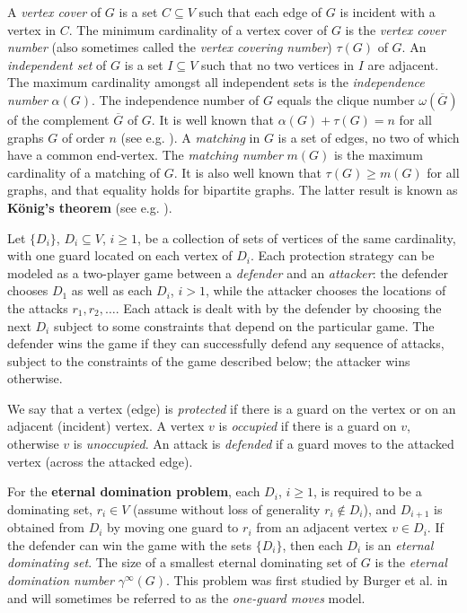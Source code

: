 \documentclass[12pt]{article}%
\begin{document}
A \emph{vertex cover} of $G$ is a set $C\subseteq V$ such that each edge of
$G$ is incident with a vertex in $C$. The minimum cardinality of a vertex
cover of $G$ is the \emph{vertex cover number} (also sometimes called the
\emph{vertex covering number})\emph{ }$\tau(G)$ of $G$. An \emph{independent
set} of $G$ is a set $I\subseteq V$ such that no two vertices in $I$ are
adjacent. The maximum cardinality amongst all independent sets is the
\emph{independence number} $\alpha(G)$. The independence number of $G$ equals
the clique number\emph{ }$\omega(\overline{G})$ of the complement
$\overline{G}$ of $G$. It is well known that $\alpha(G)+\tau(G)=n$ for all
graphs $G$ of order $n$ (see e.g. \cite[p. 241]{CL}). A \emph{matching }in $G$
is a set of edges, no two of which have a common end-vertex. The
\emph{matching number }$m(G)$ is the maximum cardinality of a matching of $G$.
It is also well known that $\tau(G)\geq m(G)$ for all graphs, and that
equality holds for bipartite graphs. The latter result is known as
\textbf{K\"{o}nig's theorem} (see e.g. \cite[Theorem 9.13]{CL}).



Let $\{D_{i}\}$, $D_{i}\subseteq V$, $i\geq1$, be a collection of sets of
vertices of the same cardinality, with one guard located on each vertex of
$D_{i}$. Each protection strategy can be modeled as a two-player game between
a \emph{defender} and an \emph{attacker}: the defender chooses $D_{1}$ as well
as each $D_{i}$, $i>1$, while the attacker chooses the locations of the
attacks $r_{1},r_{2},\ldots$. Each attack is dealt with by the defender by
choosing the next $D_{i}$ subject to some constraints that depend on the
particular game. The defender wins the game if they can successfully defend
any sequence of attacks, subject to the constraints of the game described
below; the attacker wins otherwise.

We say that a vertex (edge) is \emph{protected} if there is a guard on the
vertex or on an adjacent (incident) vertex. A vertex $v$ is \emph{occupied} if
there is a guard on $v$, otherwise $v$ is \emph{unoccupied}. An attack is
\emph{defended} if a guard moves to the attacked vertex (across the attacked edge).

For the \textbf{eternal domination problem}, each $D_{i}$, $i\geq1$, is
required to be a dominating set, $r_{i}\in V$ (assume without loss of
generality $r_{i}\notin D_{i}$), and $D_{i+1}$ is obtained from $D_{i}$ by
moving one guard to $r_{i}$ from an adjacent vertex $v\in D_{i}$. If the
defender can win the game with the sets $\{D_{i}\}$, then each $D_{i}$ is an
\emph{eternal dominating set}. The size of a smallest eternal dominating set
of $G$ is the \emph{eternal domination number} $\gamma^{\infty}(G)$. This
problem was first studied by Burger et al. in \cite{BCG2} and will sometimes
be referred to as the \emph{one-guard moves} model.
\end{document}
